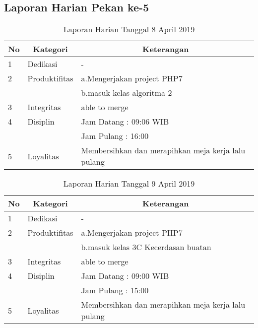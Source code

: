 \subsection{Laporan Harian Pekan ke-5}

\begin{table}[htp]
\caption{Laporan Harian Tanggal 8 April 2019}
\label{tab:lh080419}
\begin{tabular}{|l|l|l|}
\hline
\textbf{No} & \multicolumn{1}{c|}{\textbf{Kategori}} & \multicolumn{1}{c|}{\textbf{Keterangan}} \\ \hline
1 & Dedikasi & - \\ \hline
2 & Produktifitas & a.Mengerjakan project PHP7 \\
   & & b.masuk kelas algoritma 2 \\ \hline
3 & Integritas & able to merge \\ \hline
4 & Disiplin & Jam Datang : 09:06 WIB \\
   &  & Jam Pulang : 16:00 \\ \hline
5 & Loyalitas & Membersihkan dan merapihkan meja kerja lalu pulang \\ \hline
\end{tabular}
\end{table}

\begin{table}[htp]
\caption{Laporan Harian Tanggal 9 April 2019}
\label{tab:lh090419}
\begin{tabular}{|l|l|l|}
\hline
\textbf{No} & \multicolumn{1}{c|}{\textbf{Kategori}} & \multicolumn{1}{c|}{\textbf{Keterangan}} \\ \hline
1 & Dedikasi & - \\ \hline
2 & Produktifitas & a.Mengerjakan project PHP7 \\
   & & b.masuk kelas 3C Kecerdasan buatan \\ \hline
3 & Integritas & able to merge \\ \hline
4 & Disiplin & Jam Datang : 09:00 WIB \\
   &  & Jam Pulang : 15:00 \\ \hline
5 & Loyalitas & Membersihkan dan merapihkan meja kerja lalu pulang \\ \hline
\end{tabular}
\end{table}

